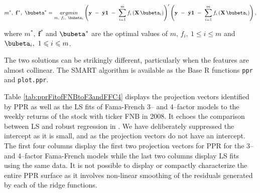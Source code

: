 \documentclass[graybox,envcountchap,sectrefs]{svmono}\usepackage[]{graphicx}\usepackage[]{xcolor}
\makeatletter
\newenvironment{kframe}{%
 \def\at@end@of@kframe{}%
 \ifinner\ifhmode%
  \def\at@end@of@kframe{\end{minipage}}%
  \begin{minipage}{\columnwidth}%
 \fi\fi%
 \def\FrameCommand##1{\hskip\@totalleftmargin \hskip-\fboxsep
 \colorbox{shadecolor}{##1}\hskip-\fboxsep
     \hskip-\linewidth \hskip-\@totalleftmargin \hskip\columnwidth}%
 \MakeFramed {\advance\hsize-\width
   \@totalleftmargin\z@ \linewidth\hsize
   \@setminipage}}%
 {\par\unskip\endMakeFramed%
 \at@end@of@kframe}
\makeatother
\begin{document}
\begin{appendices}
\begin{equation}
m^{*},\ \mathbf{f}^{*},\ \bubeta^{*}=\underset{m,\ f_{i},\ \bubeta_{i}}{argmin}\left(\mathbf{y}\ -\ \bar{\mathbf{y}}\mathbf{1}\ -\ \sum_{i=1}^{m}f_{i}\left(\mathbf{X}\,\bubeta_{i}\right)\right)^{\prime}\left(\mathbf{y}\ -\ \bar{\mathbf{y}}\mathbf{1}\ -\ \sum_{i=1}^{m}f_{i}\left(\mathbf{X}\,\bubeta_{i}\right)\right),\label{eq:SMARTppr}
\end{equation}

where $m^{*},\ \mathbf{f}^{*}$ and $\bubeta^{*}$ are the optimal
values of $m$, $f_{i},\ 1\leqslant i\leqslant m$ and $\bubeta_{i},\ 1\leqslant i\leqslant m$. 

The two solutions can be strikingly different, particularly when the
features are almost collinear. The SMART algorithm is available as
the Base R functions \texttt{ppr} and \texttt{plot.ppr}. 

Table \ref{tab:pprFitofFNBtoF3andFFC4} displays the projection vectors
identified by PPR as well as the LS fits of Fama-French 3-- and 4--factor
models to the weekly returns of the stock with ticker FNB in 2008.
It echoes the comparison between LS and robust regression in \FNBLSandRobustRegressionTable.
We have deliberately suppressed the intercept as it is small, and
as the projection vectors do not have an intercept. The first four
columns display the first two projection vectors for PPR for the 3--
and 4--factor Fama-French models while the last two columns display
LS fits using the same data. It is not possible to display or compactly
characterize the entire PPR surface as it involves non-linear smoothing
of the residuals generated by each of the ridge functions.

\begin{table}[H]
\caption{\label{tab:pprFitofFNBtoF3andFFC4}Projection Pursuit Vectors and
LS fits of FF3 and FFC4 models to FNB 2008 weekly returns.}

\begin{kframe}


{\ttfamily\noindent\bfseries\color{errorcolor}{\#\# Error in `readChar()`:\\\#\# ! cannot open the connection}}

{\ttfamily\noindent\bfseries\color{errorcolor}{\#\# Error in `readChar()`:\\\#\# ! cannot open the connection}}

{\ttfamily\noindent\bfseries\color{errorcolor}{\#\# Error in `readChar()`:\\\#\# ! cannot open the connection}}


\end{kframe}
\end{table}
\end{appendices}
\end{document}
